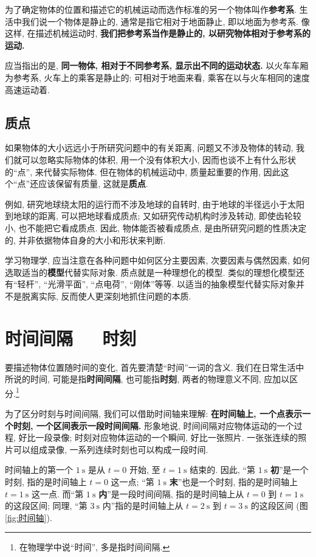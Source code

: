\documentclass[UTF8,openany,fontset=fandol]{ctexbook}
\theoremstyle{chinesetextbook}
\newcommand{\bre}{\ \ \ }
\newcommand{\unit}[1]{\ \mathrm{#1}}
\begin{document}
为了确定物体的位置和描述它的机械运动而选作标准的另一个物体叫作\textbf{参考系}. 生活中我们说一个物体是静止的, 通常是指它相对于地面静止, 即以地面为参考系. 像这样, 在描述机械运动时, \textbf{我们把参考系当作是静止的, 以研究物体相对于参考系的运动.}

应当指出的是, \textbf{同一物体, 相对于不同参考系, 显示出不同的运动状态.} 以火车车厢为参考系, 火车上的乘客是静止的; 可相对于地面来看, 乘客在以与火车相同的速度高速运动着.
\subsection{质点}
如果物体的大小远远小于所研究问题中的有关距离, 问题又不涉及物体的转动, 我们就可以忽略实际物体的体积, 用一个没有体积大小, 因而也谈不上有什么形状的“点”, 来代替实际物体. 但在物体的机械运动中, 质量起重要的作用, 因此这个“点”还应该保留有质量, 这就是\textbf{质点}.

例如, 研究地球绕太阳的运行而不涉及地球的自转时, 由于地球的半径远小于太阳到地球的距离, 可以把地球看成质点; 又如研究传动机构时涉及转动, 即使齿轮较小, 也不能把它看成质点. 因此, 物体能否被看成质点, 是由所研究问题的性质决定的, 并非依据物体自身的大小和形状来判断.

学习物理学, 应当注意在各种问题中如何区分主要因素, 次要因素与偶然因素, 如何选取适当的\textbf{模型}代替实际对象. 质点就是一种理想化的模型. 类似的理想化模型还有“轻杆”, “光滑平面”, “点电荷”, “刚体”等等. 以适当的抽象模型代替实际对象并不是脱离实际, 反而使人更深刻地抓住问题的本质.
\section{时间间隔\bre 时刻}
要描述物体位置随时间的变化, 首先要清楚“时间”一词的含义. 我们在日常生活中所说的时间, 可能是指\textbf{时间间隔}, 也可能指\textbf{时刻}, 两者的物理意义不同, 应加以区分.\footnote{在物理学中说“时间”, 多是指时间间隔.}

为了区分时刻与时间间隔, 我们可以借助时间轴来理解: \textbf{在时间轴上, 一个点表示一个时刻, 一个区间表示一段时间间隔.} 形象地说, 时间间隔对应物体运动的一个过程, 好比一段录像; 时刻对应物体运动的一个瞬间, 好比一张照片. 一张张连续的照片可以组成录像, 一系列连续时刻也可以构成一段时间.

时间轴上的第一个 $1\unit{s}$ 是从 $t=0$ 开始, 至 $t=1\unit{s}$ 结束的. 因此, “第 $1\unit{s}$ \textbf{初}”是一个时刻, 指的是时间轴上 $t=0$ 这一点; “第 $1\unit{s}$ \textbf{末}”也是一个时刻, 指的是时间轴上 $t=1\unit{s}$ 这一点. 而“第 $1\unit{s}$ \textbf{内}”是一段时间间隔, 指的是时间轴上从 $t=0$ 到 $t=1\unit{s}$ 的这段区间; 同理, “第 $3\unit{s}$ 内”指的是时间轴上从 $t=2\unit{s}$ 到 $t=3\unit{s}$ 的这段区间 (图\ref{fig:时间轴}).
\end{document}
